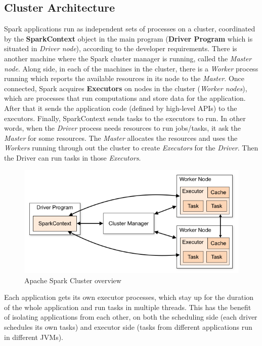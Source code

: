 \subsection{Cluster Architecture}
Spark applications run as independent sets of processes on a cluster, coordinated by the \textbf{SparkContext} object in the main program (\textbf{Driver Program} which is situated in \textit{Driver node}), according to the developer requirements. There is another machine where the Spark cluster manager is running, called the \textit{Master node}. Along side, in each of the machines in the cluster, there is a \textit{Worker} process running which reports the available resources in its node to the \textit{Master}. Once connected, Spark acquires \textbf{Executors} on nodes in the cluster (\textit{Worker nodes}), which are processes that run computations and store data for the application. After that it sends the application code (defined by high-level APIs) to the executors. Finally, SparkContext sends tasks to the executors to run. \newline
In other words, when the \textit{Driver} process needs resources to run jobs/tasks, it ask the \textit{Master} for some resources. The \textit{Master} allocates the resources and uses the \textit{Workers} running through out the cluster to create \textit{Executors} for the \textit{Driver}. Then the Driver can run tasks in those \textit{Executors}.\newline
\begin{figure}[h] 
\begin{center}
\includegraphics[scale=0.66]{figure/spark-cluster-overview.png}
\end{center}
\caption{Apache Spark Cluster overview~\label{spark_cluster}}
\end{figure}
Each application gets its own executor processes, which stay up for the duration of the whole application and run tasks in multiple threads. This has the benefit of isolating applications from each other, on both the scheduling side (each driver schedules its own tasks) and executor side (tasks from different applications run in different JVMs).\newline
